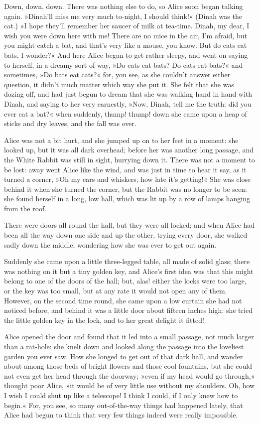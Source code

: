  
 
Down, down, down. There was nothing else to do, so Alice soon began talking again. »Dinah'll miss me very much to-night, I should think!« (Dinah was the cat.) »I hope they'll remember her saucer of milk at tea-time. Dinah, my dear, I wish you were down here with me! There are no mice in the air, I'm afraid, but you might catch a bat, and that's very like a mouse, you know. But do cats eat bats, I wonder?« And here Alice began to get rather sleepy, and went on saying to herself, in a dreamy sort of way, »Do cats eat bats? Do cats eat bats?« and sometimes, »Do bats eat cats?« for, you see, as she couldn't answer either question, it didn't much matter which way she put it. She felt that she was dozing off, and had just begun to dream that she was walking hand in hand with Dinah, and saying to her very earnestly, »Now, Dinah, tell me the truth: did you ever eat a bat?« when suddenly, thump! thump! down she came upon a heap of sticks and dry leaves, and the fall was over.

Alice was not a bit hurt, and she jumped up on to her feet in a moment: she looked up, but it was all dark overhead; before her was another long passage, and the White Rabbit was still in sight, hurrying down it. There was not a moment to be lost: away went Alice like the wind, and was just in time to hear it say, as it turned a corner, »Oh my ears and whiskers, how late it's getting!« She was close behind it when she turned the corner, but the Rabbit was no longer to be seen: she found herself in a long, low hall, which was lit up by a row of lamps hanging from the roof.

There were doors all round the hall, but they were all locked; and when Alice had been all the way down one side and up the other, trying every door, she walked sadly down the middle, wondering how she was ever to get out again.

Suddenly she came upon a little three-legged table, all made of solid glass; there was nothing on it but a tiny golden key, and Alice's first idea was that this might belong to one of the doors of the hall; but, alas! either the locks were too large, or the key was too small, but at any rate it would not open any of them. However, on the second time round, she came upon a low curtain she had not noticed before, and behind it was a little door about fifteen inches high: she tried the little golden key in the lock, and to her great delight it fitted!

Alice opened the door and found that it led into a small passage, not much larger than a rat-hole: she knelt down and looked along the passage into the loveliest garden you ever saw. How she longed to get out of that dark hall, and wander about among those beds of bright flowers and those cool fountains, but she could not even get her head through the doorway; »even if my head would go through,« thought poor Alice, »it would be of very little use without my shoulders. Oh, how I wish I could shut up like a telescope! I think I could, if I only knew how to begin.« For, you see, so many out-of-the-way things had happened lately, that Alice had begun to think that very few things indeed were really impossible.

